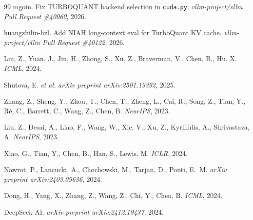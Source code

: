 \documentclass[11pt,a4paper]{article}
\theoremstyle{definition}
\theoremstyle{plain}
\begin{document}
\begin{thebibliography}{99}
mgoin.
\newblock Fix TURBOQUANT backend selection in \texttt{cuda.py}.
\newblock \emph{vllm-project/vllm Pull Request \#40060}, 2026.

huangzhilin-hzl.
\newblock [TurboQuant] Add NIAH long-context eval for TurboQuant KV cache.
\newblock \emph{vllm-project/vllm Pull Request \#40122}, 2026.

Liu, Z., Yuan, J., Jin, H., Zhong, S., Xu, Z., Braverman, V., Chen, B., Hu, X.
\newblock \emph{ICML}, 2024.

Shutova, E. \emph{et al.}
\newblock \emph{arXiv preprint arXiv:2501.19392}, 2025.

Zhang, Z., Sheng, Y., Zhou, T., Chen, T., Zheng, L., Cai, R., Song, Z., Tian, Y., R\'e, C., Barrett, C., Wang, Z., Chen, B.
\newblock \emph{NeurIPS}, 2023.

Liu, Z., Desai, A., Liao, F., Wang, W., Xie, V., Xu, Z., Kyrillidis, A., Shrivastava, A.
\newblock \emph{NeurIPS}, 2023.

Xiao, G., Tian, Y., Chen, B., Han, S., Lewis, M.
\newblock \emph{ICLR}, 2024.

Nawrot, P., Lancucki, A., Chochowski, M., Tarjan, D., Ponti, E.~M.
\newblock \emph{arXiv preprint arXiv:2403.09636}, 2024.

Dong, H., Yang, X., Zhang, Z., Wang, Z., Chi, Y., Chen, B.
\newblock \emph{ICML}, 2024.

DeepSeek-AI.
\newblock \emph{arXiv preprint arXiv:2412.19437}, 2024.



\end{thebibliography}
\end{document}
